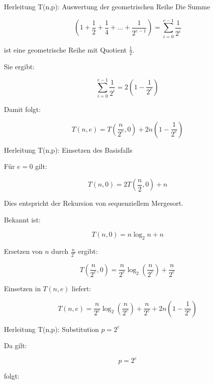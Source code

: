 {\begin{frame}{Herleitung T(n,p): Auswertung der geometrischen Reihe}
        Die Summe

        \[
            \left(
            1+\frac12+\frac14+\dots+\frac1{2^{e-1}}
            \right) = \sum_{i=0}^{e-1} \frac{1}{2^i}
        \]

        ist eine geometrische Reihe mit Quotient $\frac{1}{2}$.

        Sie ergibt:

        \[
            \sum_{i=0}^{e-1} \frac{1}{2^i}
            =
            2\left(1-\frac1{2^e}\right)
        \]

        Damit folgt:

        \[
            T(n,e)
            =
            T\!\left(\frac{n}{2^e},0\right)
            +
            2n\left(1-\frac1{2^e}\right)
        \]

    \end{frame}

    \begin{frame}{Herleitung T(n,p): Einsetzen des Basisfalls}

        Für $e=0$ gilt:

        \[
            T(n,0)=2T\!\left(\frac{n}{2},0\right)+n
        \]

        Dies entspricht der Rekursion von sequenziellem Mergesort.

        Bekannt ist:

        \[
            T(n,0)=n\log_2 n + n
        \]

        Ersetzen von $n$ durch $\frac{n}{2^e}$ ergibt:

        \[
            T\!\left(\frac{n}{2^e},0\right)
            =
            \frac{n}{2^e}
            \log_2\!\left(\frac{n}{2^e}\right)
            +
            \frac{n}{2^e}
        \]

        Einsetzen in $T(n,e)$ liefert:

        \[
            T(n,e)
            =
            \frac{n}{2^e}
            \log_2\!\left(\frac{n}{2^e}\right)
            +
            \frac{n}{2^e}
            +
            2n\left(1-\frac1{2^e}\right)
        \]

    \end{frame}

    \begin{frame}{Herleitung T(n,p): Substitution $p = 2^e$}

        Da gilt:

        \[
            p = 2^e
        \]

        folgt:


\end{frame}}
